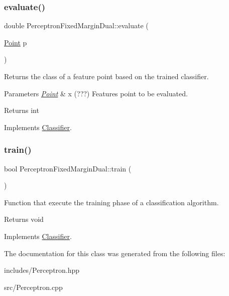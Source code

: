 \subsubsection{\texorpdfstring{evaluate()}{evaluate()}}
{\footnotesize\ttfamily double Perceptron\+Fixed\+Margin\+Dual\+::evaluate (\begin{DoxyParamCaption}\item[{\hyperlink{class_point}{Point}}]{p }\end{DoxyParamCaption})\hspace{0.3cm}{\ttfamily [virtual]}}



Returns the class of a feature point based on the trained classifier. 


\begin{DoxyParams}{Parameters}
{\em \hyperlink{class_point}{Point}} & x (???) Features point to be evaluated. \\
\hline
\end{DoxyParams}
\begin{DoxyReturn}{Returns}
int 
\end{DoxyReturn}


Implements \hyperlink{class_classifier_ae8e9554823b85ddc2dcad2955da811d9}{Classifier}.

\mbox{\label{class_perceptron_fixed_margin_dual_aa095c90a3d04f70e1cf2e38e2afa769b}} 
\subsubsection{\texorpdfstring{train()}{train()}}
{\footnotesize\ttfamily bool Perceptron\+Fixed\+Margin\+Dual\+::train (\begin{DoxyParamCaption}{ }\end{DoxyParamCaption})\hspace{0.3cm}{\ttfamily [virtual]}}



Function that execute the training phase of a classification algorithm. 

\begin{DoxyReturn}{Returns}
void 
\end{DoxyReturn}


Implements \hyperlink{class_classifier_a2306a5de27555ab093593ac9642bc7d9}{Classifier}.



The documentation for this class was generated from the following files\+:\begin{DoxyCompactItemize}
\item 
includes/Perceptron.\+hpp\item 
src/Perceptron.\+cpp\end{DoxyCompactItemize}
